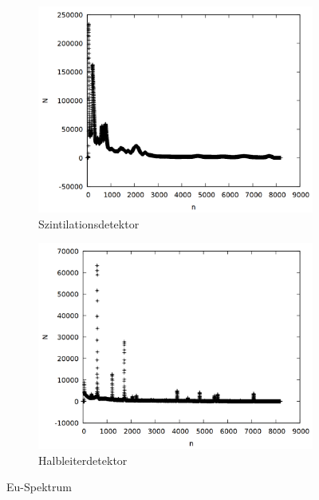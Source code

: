 \begin{figure}[h]
  \centering
  \begin{subfigure}[h]{0.5\textwidth}
    \centering
    \includegraphics[width=\textwidth]{data/si_eu_raw.png}
    \caption{Szintilationsdetektor}
  \end{subfigure}%
  \begin{subfigure}[h]{0.5\textwidth}
    \centering
    \includegraphics[width=\textwidth]{data/ge_eu_raw.png}
    \caption{Halbleiterdetektor}
  \end{subfigure}
  \caption{Eu-Spektrum}
\end{figure}


